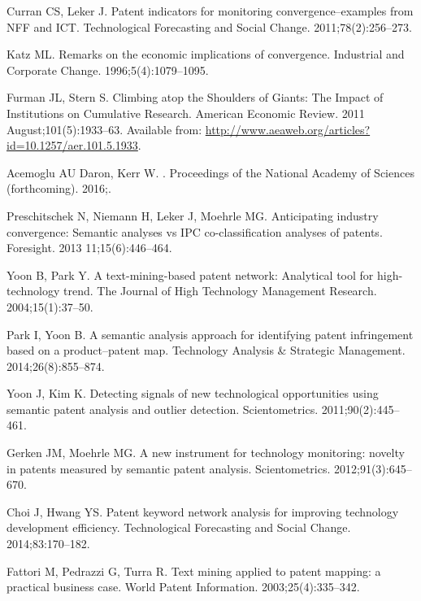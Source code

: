 \documentclass[10pt,A4,draft]{article}
\begin{document}
\begin{thebibliography}{10}
Curran CS, Leker J.
\newblock Patent indicators for monitoring convergence--examples from NFF and
  ICT.
\newblock Technological Forecasting and Social Change. 2011;78(2):256--273.

Katz ML.
\newblock Remarks on the economic implications of convergence.
\newblock Industrial and Corporate Change. 1996;5(4):1079--1095.

Furman JL, Stern S.
\newblock Climbing atop the Shoulders of Giants: The Impact of Institutions on
  Cumulative Research.
\newblock American Economic Review. 2011 August;101(5):1933--63.
\newblock Available from:
  \url{http://www.aeaweb.org/articles?id=10.1257/aer.101.5.1933}.

Acemoglu AU Daron, Kerr W.
.
\newblock Proceedings of the National Academy of Sciences (forthcoming). 2016;.

Preschitschek N, Niemann H, Leker J, Moehrle MG.
\newblock Anticipating industry convergence: Semantic analyses vs IPC
  co-classification analyses of patents.
\newblock Foresight. 2013 11;15(6):446--464.

Yoon B, Park Y.
\newblock A text-mining-based patent network: Analytical tool for
  high-technology trend.
\newblock The Journal of High Technology Management Research.
  2004;15(1):37--50.

Park I, Yoon B.
\newblock A semantic analysis approach for identifying patent infringement
  based on a product--patent map.
\newblock Technology Analysis \& Strategic Management. 2014;26(8):855--874.

Yoon J, Kim K.
\newblock Detecting signals of new technological opportunities using semantic
  patent analysis and outlier detection.
\newblock Scientometrics. 2011;90(2):445--461.

Gerken JM, Moehrle MG.
\newblock A new instrument for technology monitoring: novelty in patents
  measured by semantic patent analysis.
\newblock Scientometrics. 2012;91(3):645--670.

Choi J, Hwang YS.
\newblock Patent keyword network analysis for improving technology development
  efficiency.
\newblock Technological Forecasting and Social Change. 2014;83:170--182.

Fattori M, Pedrazzi G, Turra R.
\newblock Text mining applied to patent mapping: a practical business case.
\newblock World Patent Information. 2003;25(4):335--342.


\end{thebibliography}
\end{document}
